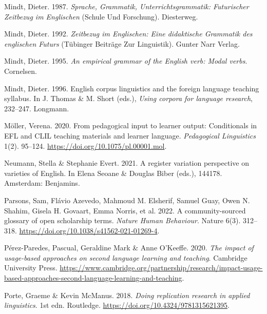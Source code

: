 \documentclass[
  letterpaper,
  DIV=11,
  numbers=noendperiod]{scrreprt}
\newlength{\cslhangindent}
\newenvironment{CSLReferences}[2] %
 {\begin{list}{}{%
  \setlength{\itemindent}{0pt}
  \setlength{\leftmargin}{0pt}
  \setlength{\parsep}{0pt}
  \ifodd #1
   \setlength{\leftmargin}{\cslhangindent}
   \setlength{\itemindent}{-1\cslhangindent}
  \fi
  \setlength{\itemsep}{#2\baselineskip}}}
 {\end{list}}
\begin{document}
\begin{CSLReferences}{1}{0}
Mindt, Dieter. 1987. \emph{Sprache, {Grammatik}, {Unterrichtsgrammatik}:
Futurischer {Zeitbezug} im {Englischen}} (Schule Und {Forschung}).
Diesterweg.

Mindt, Dieter. 1992. \emph{Zeitbezug im {Englischen}: Eine didaktische
{Grammatik} des englischen {Futurs}} (Tübinger Beiträge Zur Linguistik).
Gunter Narr Verlag.

Mindt, Dieter. 1995. \emph{An empirical grammar of the {English} verb:
Modal verbs}. Cornelsen.

Mindt, Dieter. 1996. English corpus linguistics and the foreign language
teaching syllabus. In J. Thomas \& M. Short (eds.), \emph{Using corpora
for language research}, 232--247. Longmann.

Möller, Verena. 2020. From pedagogical input to learner output:
Conditionals in EFL and CLIL teaching materials and learner language.
\emph{Pedagogical Linguistics} 1(2). 95--124.
\url{https://doi.org/10.1075/pl.00001.mol}.

Neumann, Stella \& Stephanie Evert. 2021. A register variation
perspective on varieties of {English}. In Elena Seoane \& Douglas Biber
(eds.), 144178. Amsterdam: Benjamins.

Parsons, Sam, Flávio Azevedo, Mahmoud M. Elsherif, Samuel Guay, Owen N.
Shahim, Gisela H. Govaart, Emma Norris, et al. 2022. A community-sourced
glossary of open scholarship terms. \emph{Nature Human Behaviour}.
Nature 6(3). 312--318. \url{https://doi.org/10.1038/s41562-021-01269-4}.

Pérez-Paredes, Pascual, Geraldine Mark \& Anne O'Keeffe. 2020. \emph{The
impact of usage-based approaches on second language learning and
teaching}. Cambridge University Press.
\url{https://www.cambridge.org/partnership/research/impact-usage-based-approaches-second-language-learning-and-teaching}.

Porte, Graeme \& Kevin McManus. 2018. \emph{Doing replication research
in applied linguistics}. 1st edn. Routledge.
\url{https://doi.org/10.4324/9781315621395}.


\end{CSLReferences}
\end{document}
